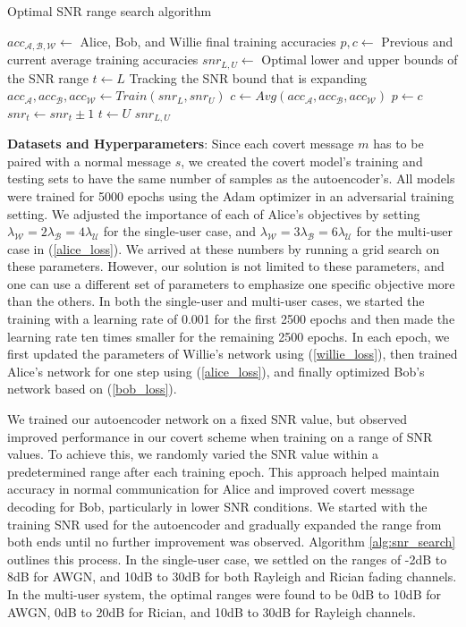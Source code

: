 \begin{algorithm}[bp!]
	\caption{Optimal SNR range search algorithm}\label{alg:snr_search}
	\small
	\begin{algorithmic}
		\State $acc_{\mathcal{A, B, W}} \gets$ Alice, Bob, and Willie final training accuracies
		\State $p, c \gets$ Previous and current average training accuracies
		\State $snr_{L, U} \gets$ Optimal lower and upper bounds of the SNR range
		\State $t \gets L$ Tracking the SNR bound that is expanding
		\State $acc_{\mathcal{A}}, acc_{\mathcal{B}}, acc_{\mathcal{W}} \gets Train(snr_{L}, snr_{U})$
		\State $c \gets Avg(acc_{\mathcal{A}}, acc_{\mathcal{B}}, acc_{\mathcal{W}})$
		\State $p \gets c$
		\State $snr_{t} \gets snr_{t} \pm 1$
		\Else
		\State $t \gets U$
		\Else
		\State \Return $snr_{L, U}$
		\EndIf
		\EndIf
		\EndWhile
	\end{algorithmic}
\end{algorithm}

\textbf{Datasets and Hyperparameters}: Since each covert message \(m\) has to be paired with a normal message \(s\), we created the covert model's training and testing sets to have the same number of samples as the autoencoder's. All models were trained for 5000 epochs using the Adam optimizer in an adversarial training setting. We adjusted the importance of each of Alice's objectives by setting \(\lambda_{\mathcal{W}} = 2 \lambda_{\mathcal{B}} = 4 \lambda_{\mathcal{U}}\) for the single-user case, and \(\lambda_{\mathcal{W}} = 3 \lambda_{\mathcal{B}} = 6 \lambda_{\mathcal{U}}\) for the multi-user case in (\ref{alice_loss}). We arrived at these numbers by running a grid search on these parameters. However, our solution is not limited to these parameters, and one can use a different set of parameters to emphasize one specific objective more than the others. In both the single-user and multi-user cases, we started the training with a learning rate of 0.001 for the first 2500 epochs and then made the learning rate ten times smaller for the remaining 2500 epochs. In each epoch, we first updated the parameters of Willie's network using (\ref{willie_loss}), then trained Alice's network for one step using (\ref{alice_loss}), and finally optimized Bob's network based on (\ref{bob_loss}).

We trained our autoencoder network on a fixed SNR value, but observed improved performance in our covert scheme when training on a range of SNR values. To achieve this, we randomly varied the SNR value within a predetermined range after each training epoch. This approach helped maintain accuracy in normal communication for Alice and improved covert message decoding for Bob, particularly in lower SNR conditions. We started with the training SNR used for the autoencoder and gradually expanded the range from both ends until no further improvement was observed. Algorithm \ref{alg:snr_search} outlines this process. In the single-user case, we settled on the ranges of -2dB to 8dB for AWGN, and 10dB to 30dB for both Rayleigh and Rician fading channels. In the multi-user system, the optimal ranges were found to be 0dB to 10dB for AWGN, 0dB to 20dB for Rician, and 10dB to 30dB for Rayleigh channels.

